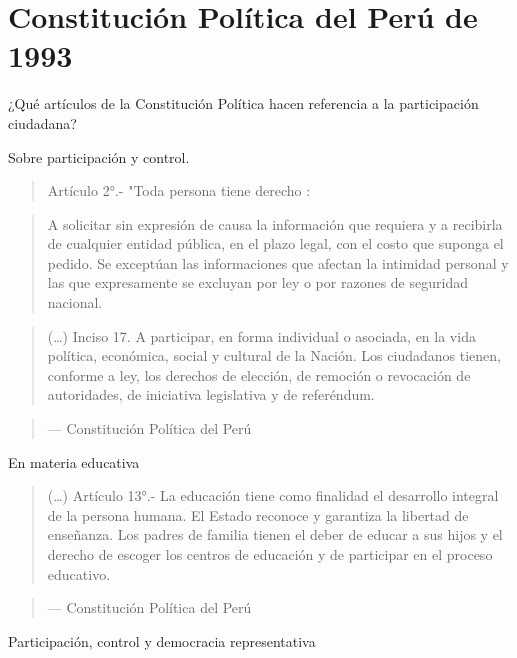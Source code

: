 \documentclass[
]{book}
\begin{document}
\hypertarget{constituciuxf3n-poluxedtica-del-peruxfa-de-1993}{%
\section{Constitución Política del Perú de 1993}\label{constituciuxf3n-poluxedtica-del-peruxfa-de-1993}}

¿Qué artículos de la Constitución Política hacen referencia a la participación ciudadana?

Sobre participación y control.

\begin{quote}
Artículo 2°.-
"Toda persona tiene derecho :
\end{quote}

\begin{quote}
A solicitar sin expresión de causa la información que requiera y a recibirla
de cualquier entidad pública, en el plazo legal, con el costo que suponga el
pedido. Se exceptúan las informaciones que afectan la intimidad personal
y las que expresamente se excluyan por ley o por razones de seguridad
nacional.
\end{quote}

\begin{quote}
(\ldots) Inciso 17. A participar, en forma individual o asociada, en la vida política, económica,
social y cultural de la Nación. Los ciudadanos tienen, conforme a ley, los
derechos de elección, de remoción o revocación de autoridades, de
iniciativa legislativa y de referéndum.
\end{quote}

\begin{quote}
--- Constitución Política del Perú
\end{quote}

En materia educativa

\begin{quote}
(\ldots) Artículo 13°.- La educación tiene como finalidad el desarrollo integral de la
persona humana. El Estado reconoce y garantiza la libertad de enseñanza. Los
padres de familia tienen el deber de educar a sus hijos y el derecho de escoger
los centros de educación y de participar en el proceso educativo.
\end{quote}

\begin{quote}
--- Constitución Política del Perú
\end{quote}

Participación, control y democracia representativa
\end{document}
